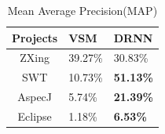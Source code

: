 % 		
% 			
% 			
% 			
% 			

\begin{table}[h]
	\begin{center}
		\caption{Mean Average Precision(MAP)}
		\label{performance_map}
		
		\begin{tabular}{c|l|l} %
			\textbf{Projects} & \textbf{VSM} & \textbf{DRNN}  \\
			\hline\hline
			ZXing& 39.27\%&30.83\% \\
			
			SWT & 10.73\%  & \textbf{51.13\%}   \\
			
			AspecJ &5.74\% & \textbf{21.39\%}\\
			
			Eclipse &1.18\% & \textbf{6.53\%} \\
			
		\end{tabular}
	\end{center}
\end{table}

